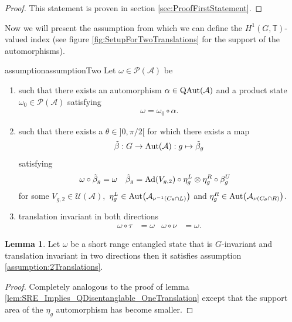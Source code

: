 \documentclass[12pt,a4paper,twoside]{article}
\let\originalleft\left
\let\originalright\right
\renewcommand{\left}{\mathopen{}\mathclose\bgroup\originalleft}
\renewcommand{\right}{\aftergroup\egroup\originalright}
\newcommand{\UU}{\mathcal U}
\newcommand{\PP}{\mathcal P}
\newcommand{\TT}{\mathbb T}
\renewcommand{\AA}{\mathcal A}
\newcommand{\Ad}[1]{\textrm{Ad}\left(#1\right)}
\newcommand{\Aut}[1]{\textrm{Aut}\left(#1\right)}
\newcommand{\QAut}[1]{\textrm{QAut}\left(#1\right)}
\theoremstyle{definition}
\newtheorem{lemma}[theorem]{Lemma}
\numberwithin{equation}{section}
\begin{document}
\begin{proof}
	This statement is proven in section \ref{sec:ProofFirstStatement}.
\end{proof}

Now we will present the assumption from which we can define the $H^1(G,\TT)$-valued index (see figure \ref{fig:SetupForTwoTranslations} for the support of the automorphisms).
\begin{restatable}{assumption}{assumptionTwo}\label{assumption:2Translations}
	Let $\omega\in\PP(\AA)$ be
	\begin{enumerate}
		\item such that there exists an automorphism $\alpha\in\QAut{\AA}$ and a product state $\omega_0\in\PP(\AA)$ satisfying
		\begin{align}
			\omega=\omega_0\circ\alpha.
		\end{align}
		\item such that there exists a $\theta\in]0,\pi/2[$ for which there exists a map
		\begin{equation}
			\tilde\beta:G\rightarrow\Aut{\AA}:g\mapsto\tilde\beta_g
		\end{equation}
		satisfying
		\begin{align}
			\label{eq:2TranslationsCondition3part1}
			\omega\circ\tilde\beta_g&=\omega&\tilde\beta_g&=\Ad{V_{g,2}}\circ\eta^L_g\otimes\eta^R_g\circ\beta^U_g
		\end{align}
		for some $V_{g,2}\in\UU(\AA),$ $\eta^L_g\in\Aut{\AA_{\nu^{-1}(C_\theta\cap L)}}$ and  $\eta^R_g\in\Aut{\AA_{\nu(C_\theta\cap R)}}$.
		\item translation invariant in both directions
		\begin{align}
			\omega\circ\tau&=\omega&\omega\circ\nu&=\omega.
		\end{align}
	\end{enumerate}
\end{restatable}
\begin{lemma}\label{lem:SRE_Implies_QDisentanglable_TwoTranslations}
	Let $\omega$ be a short range entangled state that is $G$-invariant and translation invariant in two directions then it satisfies assumption \ref{assumption:2Translations}.
\end{lemma}
\begin{proof}
	Completely analogous to the proof of lemma \ref{lem:SRE_Implies_QDisentanglable_OneTranslation} except that the support area of the $\eta_g$ automorphism has become smaller.
\end{proof}
\end{document}
